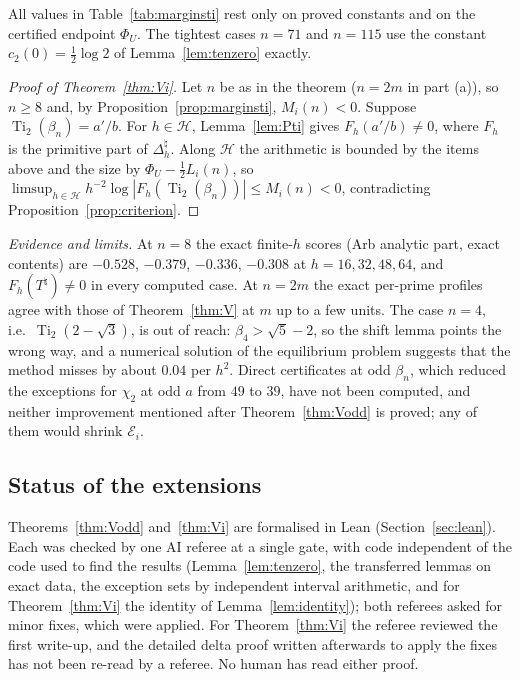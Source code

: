 \documentclass[11pt]{amsart}
\theoremstyle{definition}
\theoremstyle{remark}
\numberwithin{equation}{section}
\newcommand{\cE}{\mathcal{E}}
\newcommand{\Ti}{\operatorname{Ti}}
\begin{document}
All values in Table~\ref{tab:marginsti} rest only on proved constants and on the certified endpoint $\Phi_U$. The
tightest cases $n=71$ and $n=115$ use the constant $c_2(0)=\frac12\log2$ of Lemma~\ref{lem:tenzero} exactly.

\begin{proof}[Proof of Theorem~\ref{thm:Vi}]
Let $n$ be as in the theorem ($n=2m$ in part (a)), so $n\ge8$ and, by Proposition~\ref{prop:marginsti}, $M_i(n)<0$.
Suppose $\Ti_2(\beta_n)=a'/b$. For $h\in\mathcal H$, Lemma~\ref{lem:Pti} gives $F_h(a'/b)\ne0$, where $F_h$ is the
primitive part of $\Delta^\natural_h$. Along $\mathcal H$ the arithmetic is bounded by the items above and the size by
$\Phi_U-\frac12L_i(n)$, so $\limsup_{h\in\mathcal H}h^{-2}\log|F_h(\Ti_2(\beta_n))|\le M_i(n)<0$, contradicting
Proposition~\ref{prop:criterion}.
\end{proof}

\emph{Evidence and limits.} At $n=8$ the exact finite-$h$ scores (Arb analytic part, exact contents) are $-0.528$,
$-0.379$, $-0.336$, $-0.308$ at $h=16,32,48,64$, and $F_h(T^\natural)\ne0$ in every computed case. At $n=2m$ the exact
per-prime profiles agree with those of Theorem~\ref{thm:V} at $m$ up to a few units. The case $n=4$, i.e.\
$\Ti_2(2-\sqrt3)$, is out of reach: $\beta_4>\sqrt5-2$, so the shift lemma points the wrong way, and a numerical solution of
the equilibrium problem suggests that the method misses by about $0.04$ per $h^2$. Direct certificates at odd $\beta_n$,
which reduced the exceptions for $\chi_2$ at odd $a$ from $49$ to $39$, have not been computed, and neither improvement
mentioned after Theorem~\ref{thm:Vodd} is proved; any of them would shrink $\cE_i$.

\subsection{Status of the extensions}
Theorems~\ref{thm:Vodd} and~\ref{thm:Vi} are formalised in Lean (Section~\ref{sec:lean}). Each was checked by
one AI referee at a single gate,
with code independent of the code used to find the results (Lemma~\ref{lem:tenzero}, the transferred lemmas on exact
data, the exception sets by independent interval arithmetic, and for Theorem~\ref{thm:Vi} the identity of
Lemma~\ref{lem:identity}); both referees asked for minor fixes, which were applied. For Theorem~\ref{thm:Vi} the referee
reviewed the first write-up, and the detailed delta proof written afterwards to apply the fixes has not been re-read by a
referee. No human has read either proof.
\end{document}
